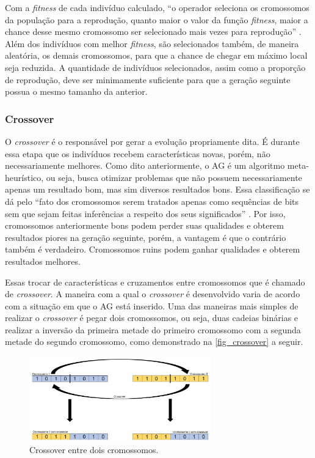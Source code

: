 Com a \textit{fitness} de cada indivíduo calculado, “o
operador seleciona os cromossomos da população para a
reprodução, quanto maior o valor da função \textit{fitness}, maior a
chance desse mesmo cromossomo ser selecionado mais vezes para
reprodução” \cite{mitchell1998introduction}.  Além dos
indivíduos com melhor \textit{fitness}, são selecionados também, de
maneira aleatória, os demais cromossomos, para que a chance de
chegar em máximo local seja reduzida. A quantidade de
indivíduos selecionados, assim como a proporção de reprodução,
deve ser minimamente suficiente para que a geração seguinte
possua o mesmo tamanho da anterior.

\subsubsection{Crossover}

O \textit{crossover} é o responsável por gerar a evolução propriamente
dita. É durante essa etapa que os indivíduos recebem
características novas, porém, não necessariamente melhores.
Como dito anteriormente, o AG é um algoritmo meta-heurístico,
ou seja, busca otimizar problemas que não possuem
necessariamente apenas um resultado bom, mas sim diversos
resultados bons. Essa classificação se dá pelo “fato dos
cromossomos serem tratados apenas como sequências de bits sem
que sejam feitas inferências a respeito dos seus significados”
\cite{paulino2018}. Por isso, cromossomos anteriormente bons
podem perder suas qualidades e obterem resultados piores na
geração seguinte, porém, a vantagem é que o contrário também é
verdadeiro. Cromossomos ruins podem ganhar qualidades e
obterem resultados melhores.

Essas trocar de características e cruzamentos entre
cromossomos que é chamado de \textit{crossover}. A maneira com a qual o
\textit{crossover} é desenvolvido varia de acordo com a
situação em que o AG está inserido. Uma das maneiras mais
simples de realizar o \textit{crossover} é pegar dois cromossomos, ou
seja, duas cadeias binárias e realizar a inversão da primeira
metade do primeiro cromossomo com a segunda metade do segundo
cromossomo, como demonstrado na \autoref{fig_crossover} a
seguir.

\begin{figure}[htb]
        \centering
        \caption{\label{fig_crossover}Crossover entre dois cromossomos.}
        \includegraphics[width=0.7\textwidth]{images/crossover.jpg}
\end{figure}

